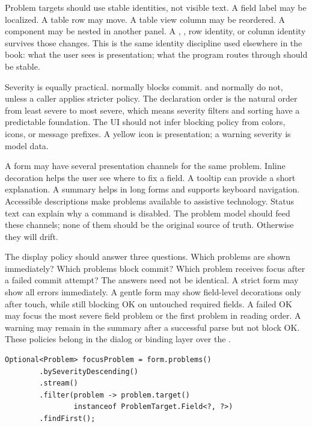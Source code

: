 Problem targets should use stable identities, not visible text. A field label
may be localized. A table row may move. A table view column may be reordered.
A component may be nested in another panel. A ,
, row identity, or column identity survives those changes.
This is the same identity discipline used elsewhere in the book: what the user
sees is presentation; what the program routes through should be stable.

Severity is equally practical.  normally blocks
commit.  and  normally
do not, unless a caller applies stricter policy. The declaration order is the
natural order from least severe to most severe, which means severity filters
and sorting have a predictable foundation. The UI should not infer blocking
policy from colors, icons, or message prefixes. A yellow icon is presentation;
a warning severity is model data.

A form may have several presentation channels for the same problem. Inline
decoration helps the user see where to fix a field. A tooltip can provide a
short explanation. A summary helps in long forms and supports keyboard
navigation. Accessible descriptions make problems available to assistive
technology. Status text can explain why a command is disabled. The problem
model should feed these channels; none of them should be the original source
of truth. Otherwise they will drift.

The display policy should answer three questions. Which problems are shown
immediately? Which problems block commit? Which problem receives focus after a
failed commit attempt? The answers need not be identical. A strict form may
show all errors immediately. A gentle form may show field-level decorations
only after touch, while still blocking OK on untouched required fields. A
failed OK may focus the most severe field problem or the first problem in
reading order. A warning may remain in the summary after a successful parse but
not block OK. These policies belong in the dialog or binding layer over the
.

\begin{lstlisting}[caption={Selecting a focus target from structured problems.}]
Optional<Problem> focusProblem = form.problems()
        .bySeverityDescending()
        .stream()
        .filter(problem -> problem.target()
                instanceof ProblemTarget.Field<?, ?>)
        .findFirst();
\end{lstlisting}

